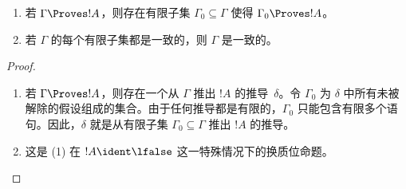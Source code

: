 \documentclass[../../../include/open-logic-section]{subfiles}
\begin{document}
\begin{prop}[紧致性]
  \begin{enumerate}
  \item 若 $\Gamma \Proves !A$，则存在有限子集 $\Gamma_0 \subseteq \Gamma$ 使得 $\Gamma_0 \Proves !A$。
  \item 若 $\Gamma$ 的每个有限子集都是一致的，则 $\Gamma$ 是一致的。
  \end{enumerate}
\end{prop}

\begin{proof}
  \begin{enumerate}
    \item 若 $\Gamma \Proves !A$，则存在一个从 $\Gamma$ 推出 $!A$ 的推导~$\delta$。令 $\Gamma_0$ 为 $\delta$ 中所有未被解除的假设组成的集合。由于任何推导都是有限的，$\Gamma_0$ 只能包含有限多个语句。因此，$\delta$ 就是从有限子集 $\Gamma_0 \subseteq \Gamma$ 推出 $!A$ 的推导。
    \item 这是 (1) 在 $!A \ident \lfalse$ 这一特殊情况下的换质位命题。
  \end{enumerate}
\end{proof}
\end{document}
